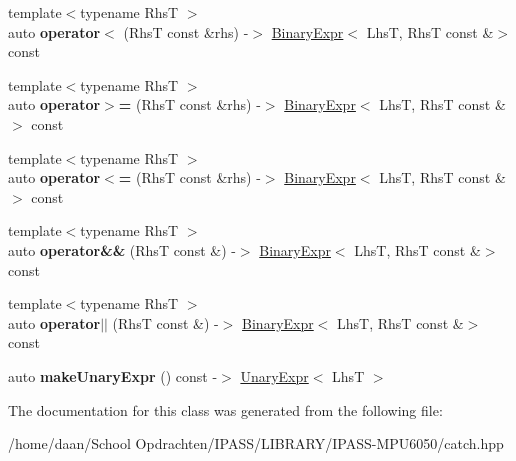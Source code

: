 \begin{DoxyCompactItemize}
\item 
\mbox{\label{classCatch_1_1ExprLhs_a55284221df2edb3542e765c87b5691b9}} 
{\footnotesize template$<$typename RhsT $>$ }\\auto {\bfseries operator$<$} (RhsT const \&rhs) -\/$>$ \hyperlink{classCatch_1_1BinaryExpr}{Binary\+Expr}$<$ LhsT, RhsT const \&$>$ const
\item 
\mbox{\label{classCatch_1_1ExprLhs_aff594ae5b957105c517a6257d2e730f0}} 
{\footnotesize template$<$typename RhsT $>$ }\\auto {\bfseries operator$>$=} (RhsT const \&rhs) -\/$>$ \hyperlink{classCatch_1_1BinaryExpr}{Binary\+Expr}$<$ LhsT, RhsT const \&$>$ const
\item 
\mbox{\label{classCatch_1_1ExprLhs_a6bd8a22c1a7fe2f66d71d7196f20af4f}} 
{\footnotesize template$<$typename RhsT $>$ }\\auto {\bfseries operator$<$=} (RhsT const \&rhs) -\/$>$ \hyperlink{classCatch_1_1BinaryExpr}{Binary\+Expr}$<$ LhsT, RhsT const \&$>$ const
\item 
\mbox{\label{classCatch_1_1ExprLhs_a5d85cdd34a136c37fa5e5283c2ff54d5}} 
{\footnotesize template$<$typename RhsT $>$ }\\auto {\bfseries operator\&\&} (RhsT const \&) -\/$>$ \hyperlink{classCatch_1_1BinaryExpr}{Binary\+Expr}$<$ LhsT, RhsT const \&$>$ const
\item 
\mbox{\label{classCatch_1_1ExprLhs_a33e5f813f5c236b9b77d977c04266f4d}} 
{\footnotesize template$<$typename RhsT $>$ }\\auto {\bfseries operator$\vert$$\vert$} (RhsT const \&) -\/$>$ \hyperlink{classCatch_1_1BinaryExpr}{Binary\+Expr}$<$ LhsT, RhsT const \&$>$ const
\item 
\mbox{\label{classCatch_1_1ExprLhs_ab68bd6d5d3ae21b7fba9010150fba95d}} 
auto {\bfseries make\+Unary\+Expr} () const -\/$>$ \hyperlink{classCatch_1_1UnaryExpr}{Unary\+Expr}$<$ LhsT $>$
\end{DoxyCompactItemize}


The documentation for this class was generated from the following file\+:\begin{DoxyCompactItemize}
\item 
/home/daan/\+School Opdrachten/\+I\+P\+A\+S\+S/\+L\+I\+B\+R\+A\+R\+Y/\+I\+P\+A\+S\+S-\/\+M\+P\+U6050/catch.\+hpp\end{DoxyCompactItemize}
